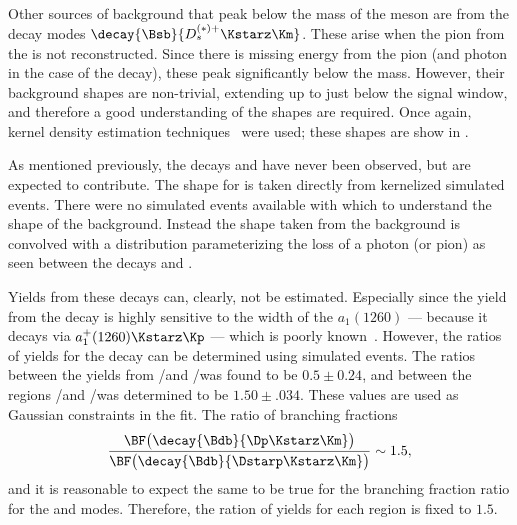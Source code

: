 



Other sources of background that peak below the mass of the \Bp meson are from the decay modes
$\decay{\Bsb}{D_s^{(*)+}\Kstarz\Km}$.
These arise when the pion from the \decay{\Kstarz}{\Kp\pim} is not reconstructed.
Since there is missing energy from the pion (and photon in the case of the \Dssp decay), these peak
significantly below the \Bp mass.
However, their background shapes are non-trivial, extending up to just below the signal window,
and therefore a good understanding of the shapes are required.
Once again, kernel density estimation techniques~\cite{Cranmer:2000du} were used; these shapes are
show in .

As mentioned previously, the decays \bstodskstrk and \bstodsstrkstrk have never been observed, but
are expected to contribute.
The shape for \bstodskstrk is taken directly from kernelized simulated events.
There were no simulated events available with which to understand the shape of the \bstodsstrkstrk
background.
Instead the shape taken from the \bstodskstrk background is convolved with a distribution
parameterizing the loss of a photon (or pion) as seen between the decays \btodsstrphi and
\bstodskstrk.


Yields from these decays can, clearly, not be estimated.
Especially since the yield from the decay \bstodskstrk is highly sensitive to the width of the
$a_1(1260)$ --- because it decays via $a_1^+(1260)\Kstarz\Kp$ --- which is poorly known~\cite{PDG2012}.
However, the ratios of yields for the \bstodskstrk decay can be determined using simulated events.
The ratios between the yields from \rA/\rB and \rC/\rD was found to be $0.5\pm0.24$, and between the
regions \rA/\rC and \rB/\rD was determined to be $1.50\pm.034$.
These values are used as Gaussian constraints in the fit.
The ratio of branching fractions
\begin{equation}
  \frac{\BF\big(\decay{\Bdb}{\Dp\Kstarz\Km}\big)}
  {\BF\big(\decay{\Bdb}{\Dstarp\Kstarz\Km}\big)}
  \sim 1.5,
\end{equation}
and it is reasonable to expect the same to be true for the branching fraction ratio for the
\bstodskstrk and \bstodsstrkstrk modes.
Therefore, the ration of yields for each region is fixed to $1.5$.

